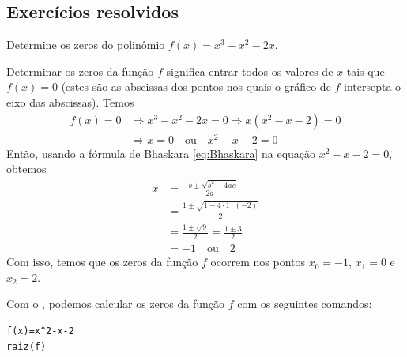 \documentclass[../main.tex]{subfiles}
\begin{document}
\subsection{Exercícios resolvidos}
\begin{exeresol}
  Determine os zeros do polinômio $f(x) = x^3-x^2-2x$.
  \begin{resol}
  Determinar os zeros da função $f$ significa entrar todos os valores de $x$ tais que $f(x)=0$ (estes são as abscissas dos pontos nos quais o gráfico de $f$ intersepta o eixo das abscissas). Temos
  \begin{align*}
    f(x)=0 &\Rightarrow x^3-x^2-2x=0 \Rightarrow x(x^2-x-2)=0\\
           &\Rightarrow x=0\quad\text{ou}\quad x^2-x-2=0
  \end{align*}
  Então, usando a fórmula de Bhaskara \eqref{eq:Bhaskara} na equação $x^2-x-2=0$, obtemos
  \begin{align*}
    x &= \frac{-b\pm\sqrt{b^2-4ac}}{2a} \\
      &= \frac{1\pm\sqrt{1-4\cdot 1\cdot (-2)}}{2}\\
      &= \frac{1\pm\sqrt{9}}{2}= \frac{1\pm 3}{2}\\
      &= -1\quad\text{ou}\quad 2
  \end{align*}
  Com isso, temos que os zeros da função $f$ ocorrem nos pontos $x_0 = -1$, $x_1=0$ e $x_2=2$.

  
  Com o \geogebra, podemos calcular os zeros da função $f$ com os seguintes comandos:
\begin{verbatim}
f(x)=x^2-x-2
raiz(f)
\end{verbatim}
\end{resol}
\end{exeresol}
\end{document}
